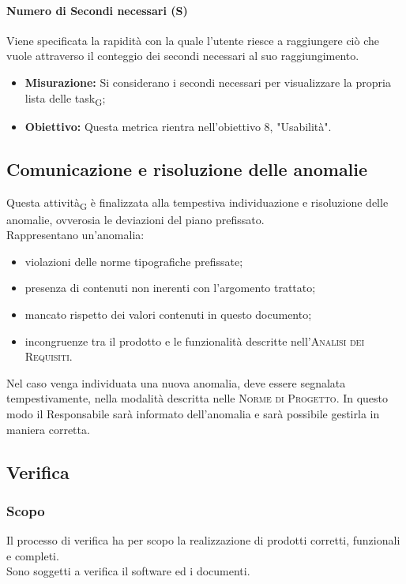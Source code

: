 	\paragraph{Numero di Secondi necessari (S)}
	Viene specificata la rapidità con la quale l'utente riesce a raggiungere ciò che vuole attraverso il conteggio dei secondi necessari al suo raggiungimento.
	\begin{itemize}
		\item \textbf{Misurazione:} Si considerano i secondi necessari per visualizzare la propria lista delle task\textsubscript{G};
		\item \textbf{Obiettivo:} Questa metrica rientra nell'obiettivo 8, "Usabilità".
	\end{itemize}
	
	
	\subsection{Comunicazione e risoluzione delle anomalie}
	
	Questa attività\textsubscript{G} è finalizzata alla tempestiva individuazione e risoluzione delle anomalie, ovverosia le deviazioni del piano prefissato.\\ Rappresentano un'anomalia:
	\begin{itemize}
		\item violazioni delle norme tipografiche prefissate;
		\item presenza di contenuti non inerenti con l'argomento trattato;
		\item mancato rispetto dei valori contenuti in questo documento;
		\item incongruenze tra il prodotto e le funzionalità descritte nell'\textsc{Analisi dei Requisiti}.
	\end{itemize}
	Nel caso venga individuata una nuova anomalia, deve essere segnalata tempestivamente, nella modalità descritta nelle \textsc{Norme di Progetto}. In questo modo il Responsabile sarà informato dell'anomalia e sarà possibile gestirla in maniera corretta.
	\pagebreak
	
	
	
	
\subsection{Verifica}
    \label{verifica}
    \subsubsection{Scopo}
    Il processo di verifica ha per scopo la realizzazione di prodotti corretti, funzionali e completi.\\Sono soggetti a verifica il software ed i documenti.
